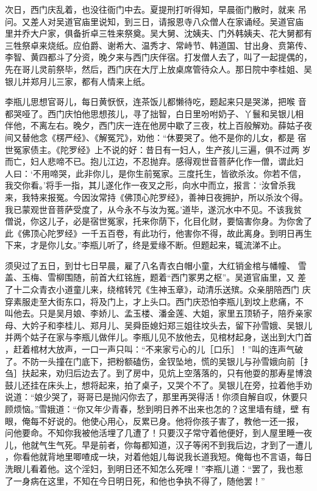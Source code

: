 次日，西门庆乱着，也没往衙门中去。夏提刑打听得知，早晨衙门散时，就来
吊问。又差人对吴道官庙里说知，到三日，请报恩寺八众僧人在家诵经。吴道官庙
里并乔大户家，俱备折卓三牲来祭奠。吴大舅、沈姨夫、门外韩姨夫、花大舅都有
三牲祭卓来烧纸。应伯爵、谢希大、温秀才、常峙节、韩道国、甘出身、贲第传、
李智、黄四都斗了分资，晚夕来与西门庆伴宿。打发僧人去了，叫了一起提偶的，
先在哥儿灵前祭毕，然后，西门庆在大厅上放桌席管待众人。那日院中李桂姐、吴
银儿并郑月儿三家，都有人情来上纸。

李瓶儿思想官哥儿，每日黄恹恹，连茶饭儿都懒待吃，题起来只是哭涕，把喉
音都哭哑了。西门庆怕他思想孩儿，寻了拙智，白日里吩咐奶子、丫鬟和吴银儿相
伴他，不离左右。晚夕，西门庆一连在他房中歇了三夜，枕上百般解劝。薛姑子夜
间又替他念《楞严经》、《解冤咒》，劝他：“休要哭了。他不是你的儿女，都是
宿世冤家债主。《陀罗经》上不说的好：昔日有一妇人，生产孩儿三遍，俱不过两
岁而亡，妇人悲啼不已。抱儿江边，不忍抛弃。感得观世音菩萨化作一僧，谓此妇
人曰：‘不用啼哭，此非你儿，是你生前冤家。三度托生，皆欲杀汝。你若不信，
我交你看。’将手一指，其儿遂化作一夜叉之形，向水中而立，报言：‘汝曾杀我
来，我特来报冤。今因汝常持《佛顶心陀罗经》，善神日夜拥护，所以杀汝个得。
我已蒙观世音菩萨受度了，从今永不与汝为冤。’道毕，遂沉水中不见。不该我贫
僧说，你这儿子，必是宿世冤家，托来你荫下，化目化财，要恼害你身。为你舍了
此《佛顶心陀罗经》一千五百卷，有此功行，他害你不得，故此离身。到明日再生
下来，才是你儿女。”李瓶儿听了，终是爱缘不断。但题起来，辄流涕不止。

须臾过了五日，到廿七日早晨，雇了八名青衣白帽小童，大红销金棺与幡幢、
雪盖、玉梅、雪柳围随，前首大红铭旌，题着“西门冢男之枢”。吴道官庙里，又
差了十二众青衣小道童儿来，绕棺转咒《生神玉章》，动清乐送殡。众亲朋陪西门
庆穿素服走至大街东口，将及门上，才上头口。西门庆恐怕李瓶儿到坟上悲痛，不
叫他去。只是吴月娘、李娇儿、孟玉楼、潘金莲、大姐，家里五顶轿子，陪乔亲家
母、大妗子和李桂儿、郑月儿、吴舜臣媳妇郑三姐往坟头去，留下孙雪娥、吴银儿
并两个姑子在家与李瓶儿做伴儿。李瓶儿见不放他去，见棺材起身，送出到大门首
，赶着棺材大放声，一口一声只叫：“不来家亏心的儿［口乐］！”叫的连声气破
了。不防一头撞在门底下，把粉额磕伤，金钗坠地，慌的吴银儿与孙雪娥向前［扌
刍］扶起来，劝归后边去了。到了房中，见炕上空落落的，只有他耍的那寿星博浪
鼓儿还挂在床头上，想将起来，拍了桌子，又哭个不了。吴银儿在旁，拉着他手劝
说道：“娘少哭了，哥哥已是抛闪你去了，那里再哭得活！你须自解自叹，休要只
顾烦恼。”雪娥道：“你又年少青春，愁到明日养不出来也怎的？这里墙有缝，壁
有眼，俺每不好说的。他使心用心，反累已身。他将你孩子害了，教他一还一报，
问他要命。不知你我被他活埋了几遭了！只要汉子常守着他便好，到人屋里睡一夜
儿，他就气生气死。早是前者，你每都知道，汉子等闲不到我后边，才到了一遭儿
，你看他就背地里唧喳成一块，对着他姐儿每说我长道我短。俺每也不言语，每日
洗眼儿看着他。这个淫妇，到明日还不知怎么死哩！”李瓶儿道：“罢了，我也惹
了一身病在这里，不知在今日明日死，和他也争执不得了，随他罢！”

